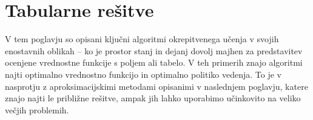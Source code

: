 \documentclass[a4paper, oneside, 12pt]{report}
\begin{document}
\chapter{Tabularne rešitve}
\thispagestyle{fancy}
V tem poglavju so opisani ključni algoritmi okrepitvenega učenja v svojih enostavnih oblikah -- ko je prostor stanj in dejanj dovolj majhen za predstavitev ocenjene vrednostne funkcije s poljem ali tabelo. V teh primerih znajo algoritmi najti optimalno vrednostno funkcijo in optimalno politiko vedenja. To je v nasprotju z aproksimacijskimi metodami opisanimi v naslednjem poglavju, katere znajo najti le približne rešitve, ampak jih lahko uporabimo učinkovito na veliko večjih problemih.
\end{document}
